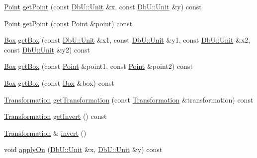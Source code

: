 \begin{DoxyCompactItemize}
\hyperlink{classHurricane_1_1Point}{Point} \hyperlink{classHurricane_1_1Transformation_aea9a0f1d1ffeb4a38accbf0c9287a93f}{get\+Point} (const \hyperlink{group__DbUGroup_ga4fbfa3e8c89347af76c9628ea06c4146}{Db\+U\+::\+Unit} \&x, const \hyperlink{group__DbUGroup_ga4fbfa3e8c89347af76c9628ea06c4146}{Db\+U\+::\+Unit} \&y) const
\item 
\hyperlink{classHurricane_1_1Point}{Point} \hyperlink{classHurricane_1_1Transformation_a002347125ae10c408aa5e74d3c36d62f}{get\+Point} (const \hyperlink{classHurricane_1_1Point}{Point} \&point) const
\item 
\hyperlink{classHurricane_1_1Box}{Box} \hyperlink{classHurricane_1_1Transformation_a1335b209ff017d8bfd6f81ae65ae6cd7}{get\+Box} (const \hyperlink{group__DbUGroup_ga4fbfa3e8c89347af76c9628ea06c4146}{Db\+U\+::\+Unit} \&x1, const \hyperlink{group__DbUGroup_ga4fbfa3e8c89347af76c9628ea06c4146}{Db\+U\+::\+Unit} \&y1, const \hyperlink{group__DbUGroup_ga4fbfa3e8c89347af76c9628ea06c4146}{Db\+U\+::\+Unit} \&x2, const \hyperlink{group__DbUGroup_ga4fbfa3e8c89347af76c9628ea06c4146}{Db\+U\+::\+Unit} \&y2) const
\item 
\hyperlink{classHurricane_1_1Box}{Box} \hyperlink{classHurricane_1_1Transformation_a4d3ad1601d31e05c76bda4b417445aff}{get\+Box} (const \hyperlink{classHurricane_1_1Point}{Point} \&point1, const \hyperlink{classHurricane_1_1Point}{Point} \&point2) const
\item 
\hyperlink{classHurricane_1_1Box}{Box} \hyperlink{classHurricane_1_1Transformation_a051ddd67572c50b3b8edf75f790006e2}{get\+Box} (const \hyperlink{classHurricane_1_1Box}{Box} \&box) const
\item 
\hyperlink{classHurricane_1_1Transformation}{Transformation} \hyperlink{classHurricane_1_1Transformation_a12ba0cbe9154661e704ce0f2638f860f}{get\+Transformation} (const \hyperlink{classHurricane_1_1Transformation}{Transformation} \&transformation) const
\item 
\hyperlink{classHurricane_1_1Transformation}{Transformation} \hyperlink{classHurricane_1_1Transformation_af9b37e39fb0ba02655eba41fe7779990}{get\+Invert} () const
\item 
\hyperlink{classHurricane_1_1Transformation}{Transformation} \& \hyperlink{classHurricane_1_1Transformation_a4d49d9fde0fe04eba9e8f0c7360f2c79}{invert} ()
\item 
void \hyperlink{classHurricane_1_1Transformation_ad37365bfd47851ca33519bb9a05b5402}{apply\+On} (\hyperlink{group__DbUGroup_ga4fbfa3e8c89347af76c9628ea06c4146}{Db\+U\+::\+Unit} \&x, \hyperlink{group__DbUGroup_ga4fbfa3e8c89347af76c9628ea06c4146}{Db\+U\+::\+Unit} \&y) const

\end{DoxyCompactItemize}
